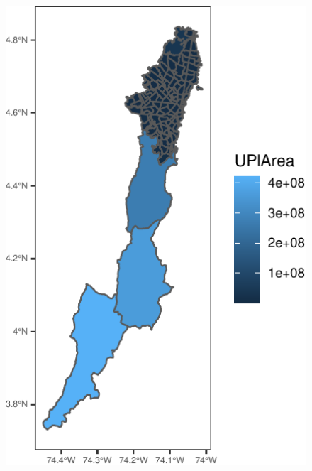 \documentclass[
  shownotes,
  xcolor={svgnames},
  hyperref={colorlinks,citecolor=DarkBlue,linkcolor=DarkRed,urlcolor=DarkBlue}
  ]{beamer}
\begin{document}
\begin{frame}[fragile]
\begin{minipage}[t]{0.43\linewidth}
\begin{figure}[H]
\includegraphics[scale=0.6]{figures/unnamed-chunk-2-2.pdf}
 \end{figure}
    \end{minipage}
\end{frame}
\end{document}
